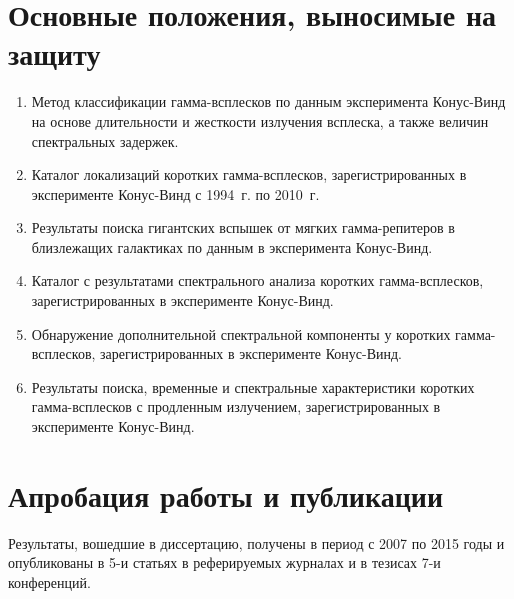\section*{Основные положения, выносимые на защиту}

\begin{enumerate}
\item Метод классификации гамма-всплесков по данным эксперимента Конус-Винд на основе
    длительности и жесткости излучения всплеска, а также величин спектральных задержек.
\item Каталог локализаций коротких гамма-всплесков, зарегистрированных в эксперименте
    Конус-Винд с 1994~г. по 2010~г.
\item Результаты поиска гигантских вспышек от мягких гамма-репитеров 
    в близлежащих галактиках по данным в эксперимента Конус-Винд. 
\item Каталог с результатами спектрального анализа коротких гамма-всплесков, 
    зарегистрированных в эксперименте Конус-Винд.
\item Обнаружение дополнительной спектральной компоненты у коротких гамма-всплесков, 
    зарегистрированных в эксперименте Конус-Винд.
\item Результаты поиска, временные и спектральные характеристики коротких гамма-всплесков 
    с продленным излучением, зарегистрированных в эксперименте Конус-Винд.
\end{enumerate}

\section*{Апробация работы и публикации}
Результаты, вошедшие в диссертацию, получены в период с 2007 по 2015
годы и опубликованы в 5-и статьях в реферируемых журналах и в тезисах 7-и конференций. 

